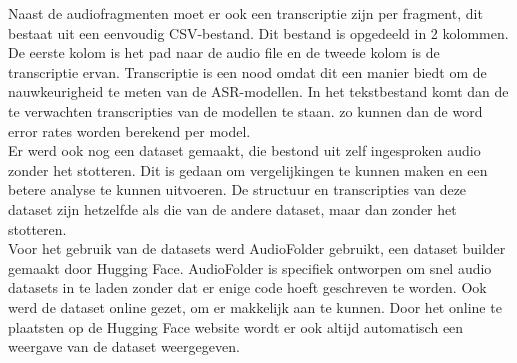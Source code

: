 Naast de audiofragmenten moet er ook een transcriptie zijn per fragment, dit bestaat uit een eenvoudig CSV-bestand. Dit bestand is opgedeeld in 2 kolommen. De eerste kolom is het pad naar de audio file en de tweede kolom is de transcriptie ervan. Transcriptie is een nood omdat dit een manier biedt om de nauwkeurigheid te meten van de ASR-modellen. In het tekstbestand komt dan de te verwachten transcripties van de modellen te staan. zo kunnen dan de word error rates worden berekend per model. \\

Er werd ook nog een dataset gemaakt, die bestond uit zelf ingesproken audio zonder het stotteren. Dit is gedaan om vergelijkingen te kunnen maken en een betere analyse te kunnen uitvoeren. De structuur en transcripties van deze dataset zijn hetzelfde als die van de andere dataset, maar dan zonder het stotteren.\\

Voor het gebruik van de datasets werd AudioFolder gebruikt, een dataset builder gemaakt door Hugging Face. AudioFolder is specifiek ontworpen om snel audio datasets in te laden zonder dat er enige code hoeft geschreven te worden. Ook werd de dataset online gezet, om er makkelijk aan te kunnen. Door het online te plaatsten op de Hugging Face website wordt er ook altijd automatisch een weergave van de dataset weergegeven.

